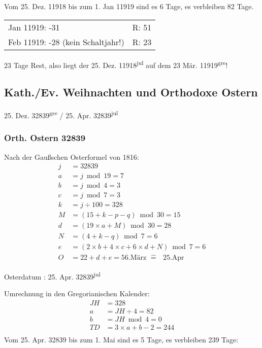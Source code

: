 			Vom 25. Dez. 11918 bis zum 1. Jan 11919 sind es 6 Tage, es verbleiben 82 Tage.

			\begin{tabular}{ll}
			Jan 11919: -31                    & R: 51 \\
			Feb 11919: -28 (kein Schaltjahr!) & R: 23
			\end{tabular}

			23 Tage Rest, also liegt der 25. Dez. 11918\textsuperscript{jul} auf dem 23 Mär. 11919\textsuperscript{gre}!
	\newpage
	\subsection{Kath./Ev. Weihnachten und Orthodoxe Ostern}
		25. Dez. 32839\textsuperscript{gre} / 25. Apr. 32839\textsuperscript{jul}
		\subsubsection{Orth. Ostern 32839}
			Nach der Gaußschen Osterformel von 1816:
			\begin{align*}
			j &= 32839														\\	
			a &= j \bmod 19 = 7												\\	
			b &= j \bmod 4 = 3												\\
			c &= j \bmod 7 = 3												\\
			k &= j \div 100 = 328											\\
			M &= (15 + k - p - q) \bmod 30 = 15								\\
			d &= (19 \times a + M) \bmod 30 = 28								\\
			N &= (4 + k - q) \bmod 7 = 6										\\
			e &= (2 \times b + 4 \times c + 6 \times d + N) \bmod 7 = 6		\\
			O &= 22 + d + e = 56\text{.März } \widehat{=} \text{ } 25\text{.Apr}
			\end{align*}

			Osterdatum : 25. Apr. 32839\textsuperscript{jul}

			Umrechnung in den Gregorianischen Kalender:
			\begin{align*}
			JH &= 328						\\
			a &= JH \div 4 = 82				\\
			b &= JH \bmod 4 = 0				\\
			TD &= 3 \times a + b - 2 = 244 	\\
			\end{align*}
			Vom 25. Apr. 32839 bis zum 1. Mai sind es 5 Tage, es verbleiben 239 Tage:

